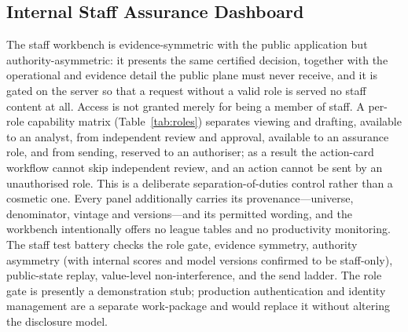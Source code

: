 \subsection{Internal Staff Assurance Dashboard}
\label{sec:staff}
The staff workbench is evidence-symmetric with the public application but authority-asymmetric: it
presents the same certified decision, together with the operational and evidence detail the public plane
must never receive, and it is gated on the server so that a request without a valid role is served no
staff content at all. Access is not granted merely for being a member of staff. A per-role capability
matrix (Table~\ref{tab:roles}) separates viewing and drafting, available to an analyst, from independent
review and approval, available to an assurance role, and from sending, reserved to an authoriser; as a
result the action-card workflow cannot skip independent review, and an action cannot be sent by an
unauthorised role. This is a deliberate separation-of-duties control rather than a cosmetic one. Every
panel additionally carries its provenance---universe, denominator, vintage and versions---and its
permitted wording, and the workbench intentionally offers no league tables and no productivity
monitoring. The staff test battery checks the role gate, evidence symmetry, authority asymmetry (with
internal scores and model versions confirmed to be staff-only), public-state replay, value-level
non-interference, and the send ladder. The role gate is presently a demonstration stub; production
authentication and identity management are a separate work-package and would replace it without altering
the disclosure model.

